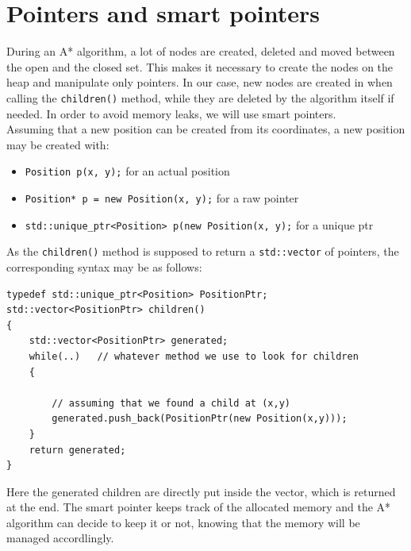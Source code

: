\documentclass{ecnreport}
\begin{document}
\section{Pointers and smart pointers}\label{smart}

During an A* algorithm, a lot of nodes are created, deleted and moved between the open and the closed set.
This makes it necessary to create the nodes on the heap and manipulate only pointers. 
In our case, new nodes are created in when calling the \texttt{children()} method, while they are deleted by the algorithm
itself if needed. In order to avoid memory leaks, we will use smart pointers.\\

Assuming that a new position can be created from its coordinates, a new position may be created with:
\begin{itemize}
\item \texttt{Position p(x, y);} for an actual position
 \item \texttt{Position* p = new Position(x, y);} for a raw pointer
 \item \texttt{std::unique\_ptr<Position> p(new Position(x, y);} for a unique ptr
\end{itemize}

As the \texttt{children()} method is supposed to return a \texttt{std::vector} of pointers, the corresponding syntax may be as follows:
\begin{center}\cppstyle
\begin{lstlisting}
typedef std::unique_ptr<Position> PositionPtr;
std::vector<PositionPtr> children()
{
    std::vector<PositionPtr> generated;
    while(..)   // whatever method we use to look for children
    {
    
        // assuming that we found a child at (x,y)
        generated.push_back(PositionPtr(new Position(x,y)));
    }
    return generated;
}
\end{lstlisting}
\end{center}
Here the generated children are directly put inside the vector, which is returned at the end. The smart pointer keeps track 
of the allocated memory and the A* algorithm can decide to keep it or not, knowing that the memory will be managed accordlingly.
\end{document}
